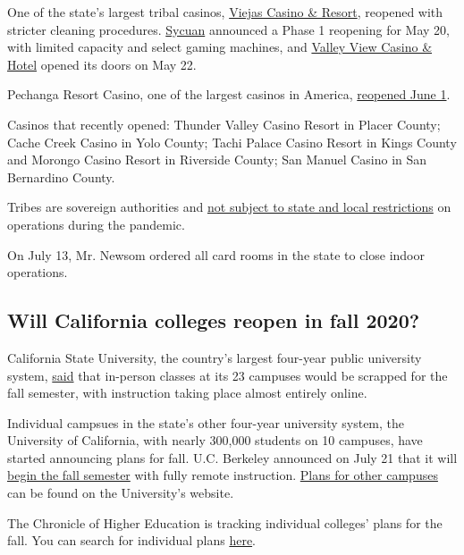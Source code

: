 One of the state's largest tribal casinos,
\href{https://viejas.com/}{Viejas Casino \& Resort}, reopened with
stricter cleaning procedures.
\href{https://www.sycuan.com/about-us/covid-19-updates/}{Sycuan}
announced a Phase 1 reopening for May 20, with limited capacity and
select gaming machines, and
\href{https://www.valleyviewcasino.com/}{Valley View Casino \& Hotel}
opened its doors on May 22.

Pechanga Resort Casino, one of the largest casinos in America,
\href{https://www.pechanga.com/}{reopened June 1}.

Casinos that recently opened: Thunder Valley Casino Resort in Placer
County; Cache Creek Casino in Yolo County; Tachi Palace Casino Resort in
Kings County and Morongo Casino Resort in Riverside County; San Manuel
Casino in San Bernardino County.

Tribes are sovereign authorities and
\href{https://www.nytimes3xbfgragh.onion/2020/05/28/us/california-virus-casinos.html}{not
subject to state and local restrictions} on operations during the
pandemic.

On July 13, Mr. Newsom ordered all card rooms in the state to close
indoor operations.

\hypertarget{will-california-colleges-reopen-in-fall-2020}{%
\subsection{Will California colleges reopen in fall
2020?}\label{will-california-colleges-reopen-in-fall-2020}}

California State University, the country's largest four-year public
university system,
\href{https://www.nytimes3xbfgragh.onion/2020/05/12/us/cal-state-online-classes.html}{said}
that in-person classes at its 23 campuses would be scrapped for the fall
semester, with instruction taking place almost entirely online.

Individual campsues in the state's other four-year university system,
the University of California, with nearly 300,000 students on 10
campuses, have started announcing plans for fall. U.C. Berkeley
announced on July 21 that it will
\href{https://news.berkeley.edu/2020/07/21/uc-berkeley-to-begin-fall-semester-with-remote-instruction/}{begin
the fall semester} with fully remote instruction.
\href{https://www.universityofcalifornia.edu/coronavirus}{Plans for
other campuses} can be found on the University's website.

The Chronicle of Higher Education is tracking individual colleges' plans
for the fall. You can search for individual plans
\href{https://www.chronicle.com/article/Here-s-a-List-of-Colleges-/248626}{here}.

